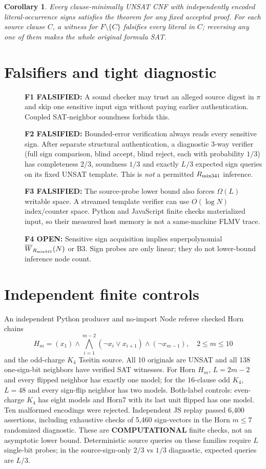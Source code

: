 \documentclass[11pt]{article}
\newtheorem{corollary}{Corollary}
\begin{document}
\begin{corollary}
Every clause-minimally UNSAT CNF with independently encoded literal-occurrence signs satisfies the theorem for any fixed accepted proof. For each source clause $C$, a witness for $F\setminus\{C\}$ falsifies every literal in $C$; reversing any one of them makes the whole original formula SAT.
\end{corollary}

\section*{Falsifiers and tight diagnostic}
\begin{description}
\item[] \textbf{F1 FALSIFIED:} A sound checker may trust an alleged source digest in $\pi$ and skip one sensitive input sign without paying earlier authentication. Coupled SAT-neighbor soundness forbids this.
\item[] \textbf{F2 FALSIFIED:} Bounded-error verification always reads every sensitive sign. After separate structural authentication, a diagnostic 3-way verifier (full sign comparison, blind accept, blind reject, each with probability $1/3$) has completeness $2/3$, soundness $1/3$ and exactly $L/3$ expected sign queries on its fixed UNSAT template. This is \emph{not} a permitted $R_{\rm mix341}$ inference.
\item[] \textbf{F3 FALSIFIED:} The source-probe lower bound also forces $\Omega(L)$ writable space. A streamed template verifier can use $O(\log N)$ index/counter space. Python and JavaScript finite checks materialized input, so their measured host memory is not a same-machine FLMV trace.
\item[] \textbf{F4 OPEN:} Sensitive sign acquisition implies superpolynomial $\overline W_{R_{\rm mix341}}(N)$ or B3. Sign probes are only linear; they do not lower-bound inference node count.
\end{description}

\section*{Independent finite controls}
An independent Python producer and no-import Node referee checked Horn chains
\[
H_m=(x_1)\wedge\bigwedge_{i=1}^{m-2}(\neg x_i\vee x_{i+1})\wedge(\neg x_{m-1}),\quad2\le m\le10
\]
and the odd-charge $K_4$ Tseitin source. All 10 originals are UNSAT and all 138 one-sign-bit neighbors have verified SAT witnesses. For Horn $H_m$, $L=2m-2$ and every flipped neighbor has exactly one model; for the 16-clause odd $K_4$, $L=48$ and every sign-flip neighbor has two models. Both-label controls: even-charge $K_4$ has eight models and Horn7 with its last unit flipped has one model. Ten malformed encodings were rejected. Independent JS replay passed 6,400 assertions, including exhaustive checks of 5,460 sign-vectors in the Horn $m\le7$ randomized diagnostic. These are \textbf{COMPUTATIONAL} finite checks, not an asymptotic lower bound. Deterministic source queries on these families require $L$ single-bit probes; in the source-sign-only $2/3$ vs $1/3$ diagnostic, expected queries are $L/3$.
\end{document}
